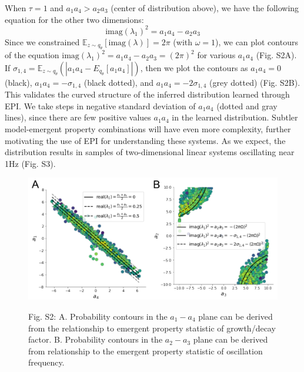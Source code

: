 \documentclass[11pt]{article}
\begin{document}
When $\tau=1$ and $a_1 a_4 > a_2 a_3$ (center of distribution above), we have the following equation for the other two dimensions:
\begin{equation}
\text{imag}(\lambda_1)^2 = a_1 a_4 - a_2 a_3
\end{equation}
Since we constrained $\mathbb{E}_{z \sim q_\theta}\left[\text{imag}(\lambda)\right] = 2 \pi$ (with $\omega=1$), we can plot contours of the equation $\text{imag}(\lambda_1)^2 = a_1 a_4 - a_2 a_3 = (2 \pi)^2$ for various $a_1 a_4$ (Fig. S2A). If $\sigma_{1,4} = \mathbb{E}_{z \sim q_\theta}(|a_1 a_4 - E_{q_\theta}[a_1 a_4]|)$, then we plot the contours as $a_1 a_4 = 0$ (black), $a_1 a_4 = -\sigma_{1,4}$ (black dotted), and $a_1 a_4 = -2\sigma_{1,4}$ (grey dotted) (Fig. S2B). This validates the curved structure of the inferred distribution learned through EPI.  We take steps in negative standard deviation of $a_1 a_4$ (dotted and gray lines), since there are few positive values $a_1 a_4$ in the learned distribution.  Subtler model-emergent property combinations will have even more complexity, further motivating the use of EPI for understanding these systems.  As we expect, the distribution results in samples of two-dimensional linear systems oscillating near 1Hz (Fig. S3).

\begin{figure}
\begin{center}
\includegraphics[scale=0.5]{figures/figS3/figS3.pdf}
\end{center}
\begin{flushleft}
Fig. S2: A. Probability contours in the $a_1-a_4$ plane can be derived from the relationship to emergent property statistic of growth/decay factor. B. Probability contours in the $a_2-a_3$ plane can be derived from relationship to the emergent property statistic of oscillation frequency.
\end{flushleft}
\end{figure}
\end{document}
